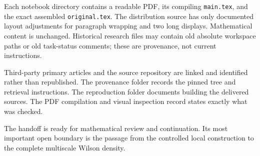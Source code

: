 Each notebook directory contains a
readable PDF, its compiling
\texttt{main.tex}, and the exact
assembled \texttt{original.tex}.
The distribution source has only
documented layout adjustments for
paragraph wrapping and two long
displays. Mathematical content is
unchanged. Historical research files
may contain old absolute workspace
paths or old task-status comments;
these are provenance, not current
instructions.

Third-party primary articles and the
source repository are linked and
identified rather than republished.
The provenance folder records the
pinned tree and retrieval instructions.
The reproduction folder documents
building the delivered sources.
The PDF compilation and visual
inspection record states exactly
what was checked.

The handoff is ready for mathematical
review and continuation. Its most
important open boundary is the
passage from the controlled local
construction to the complete
multiscale Wilson density.
